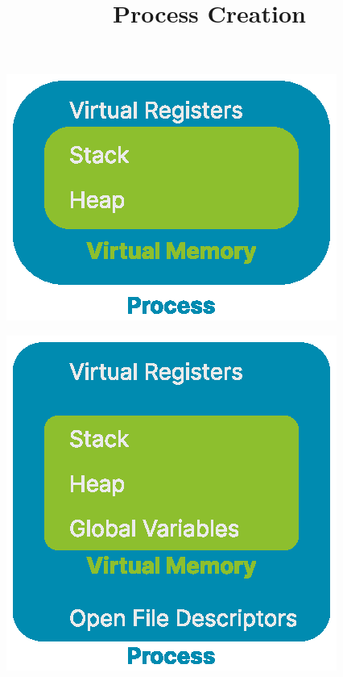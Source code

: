 

\title{Process Creation}


  \begin{frame}
    \titlepage
  \end{frame}

  \begin{slide}
    
  
    \includegraphics{../01-why-operating-systems/process-virtual-memory.eps}

  \end{slide}

  \begin{slide}


    \includegraphics{process.eps}

  \end{slide}

